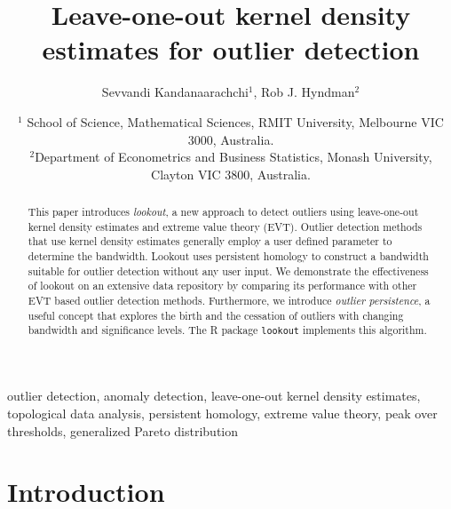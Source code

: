 \documentclass[letter,12pt]{article}
\begin{document}


\title{Leave-one-out kernel density estimates for outlier detection}
\author{Sevvandi Kandanaarachchi$^1$, Rob J. Hyndman$^2$}
\date{%
   \scriptsize{ $^1$ School of Science,  Mathematical Sciences, RMIT University, Melbourne VIC 3000, Australia.\\ 
   $^2$Department of Econometrics and Business Statistics, Monash University, Clayton VIC 3800, Australia.\\ [2ex]}%
    }
\begin{titlingpage}
\maketitle
\begin{abstract}
This paper introduces \textit{lookout}, a new approach to detect outliers using leave-one-out kernel density estimates and extreme value theory (EVT). Outlier detection methods that use  kernel density estimates generally employ a user defined parameter to determine the bandwidth. Lookout uses persistent homology to construct a bandwidth suitable for outlier detection without any user input.  We demonstrate the effectiveness of lookout on an extensive data repository by comparing its performance  with other EVT based outlier detection methods. Furthermore, we introduce \textit{outlier persistence}, a useful concept that explores the birth and the cessation of outliers with changing bandwidth and significance levels. The R package \texttt{lookout} implements this algorithm. 
\end{abstract}

\begin{keywords}outlier detection, anomaly detection, leave-one-out kernel density estimates, topological data analysis, persistent homology, extreme value theory, peak over thresholds, generalized Pareto distribution
\end{keywords}

\end{titlingpage}

\section{Introduction}\label{sec:introduction}
\end{document}
